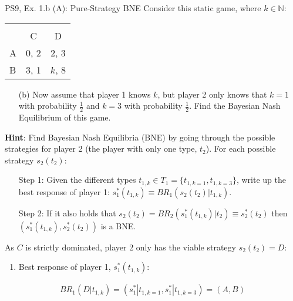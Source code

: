 \begin{frame}{PS9, Ex. 1.b (A): Pure-Strategy BNE}
    Consider this static game, where $k\in\mathbb{N}:$
    \vspace{-16pt}
    \begin{table}
      \begin{tabular}{l|c|c|}
        \multicolumn{1}{c}{} & \multicolumn{2}{c}{} \\
        \multicolumn{1}{c}{} & \multicolumn{1}{c}{C} & \multicolumn{1}{c}{D} \\\cline{2-3}
        A & 0, 2 & 2, 3 \\\cline{2-3}
        B & 3, 1 & $k$, 8 \\\cline{2-3}
      \end{tabular}
    \end{table}
    \vspace{-4pt}
    \begin{itemize}
      \item[(b)] Now assume that player 1 knows $k$, but player 2 only knows that $k = 1$ with probability $\frac{1}{2}$ and $k = 3$ with probability $\frac{1}{2}$. Find the Bayesian Nash Equilibrium of this game.
    \end{itemize}
    \vspace{-4pt}
    \begin{multicols}{2}
      \textbf{Hint}: Find Bayesian Nash Equilibria (BNE) by going through the possible strategies for player 2 (the player with only one type, $t_2$). For each possible strategy $s_2(t_2)$:
      \vspace{-4pt}
      \begin{enumerate}
        \item[Step 1:] Given the different types $t_{1,k}\in T_1=\{t_{1,k=1},t_{1,k=3}\}$, write up the best response of player 1: $s_1^*(t_{1,k})\equiv BR_1\left(s_2(t_2)|t_{1,k}\right)$.
        \item[Step 2:] If it also holds that $s_2(t_2)=BR_2\left(s_1^*(t_{1,k})|t_2\right)\equiv s_2^*(t_2)$ then $\left(s_1^*(t_{1,k}),s_2^*(t_2)\right)$ is a BNE.
      \end{enumerate}
      \vfill\null\columnbreak
      As $C$ is strictly dominated, player 2 only has the viable strategy $s_2(t_2)=D$:
      \begin{enumerate}\normalsize
        \item Best response of player 1, $s_1^*(t_{1,k}):$
      \end{enumerate}
      \vspace{-8pt}
      \begin{align*}
        BR_1\left(D|t_{1,k}\right)=(s_1^*|t_{1,k=1},s_1^*|t_{1,k=3})=(A,B)
      \end{align*}
      \vfill\null
    \end{multicols}
\end{frame}
